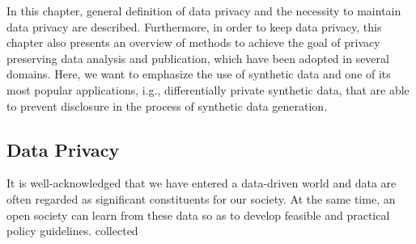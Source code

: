 In this chapter, general definition of data privacy and the necessity to maintain data privacy are described. Furthermore, in order to keep data privacy, this chapter also presents an overview of methods to achieve the goal of privacy preserving data analysis and publication, which have been adopted in several domains. Here, we want to emphasize the use of synthetic data and one of its most popular applications, i.g., differentially private synthetic data, that are able to prevent disclosure in the process of synthetic data generation.

\subsection{Data Privacy}
\label{subsec:dataprivacy}
It is well-acknowledged that we have entered a data-driven world and data are often regarded as significant constituents for our society. At the same time, an open society can learn from these data so as to develop feasible and practical policy guidelines. collected 

